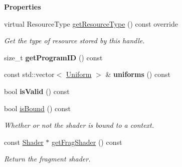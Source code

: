 \begin{Indent}\textbf{ Properties}\par
\begin{DoxyCompactItemize}
\item 
\mbox{\label{classrev_1_1_shader_program_af0766282d3272419d04f83e1a60e2553}} 
virtual Resource\+Type \mbox{\hyperlink{classrev_1_1_shader_program_af0766282d3272419d04f83e1a60e2553}{get\+Resource\+Type}} () const override
\begin{DoxyCompactList}\small\item\em Get the type of resource stored by this handle. \end{DoxyCompactList}\item 
\mbox{\label{classrev_1_1_shader_program_abc56bc121418a497d2a4d6b16f8b9a5d}} 
size\+\_\+t {\bfseries get\+Program\+ID} () const
\item 
\mbox{\label{classrev_1_1_shader_program_abee07f3196597b4d13910ca13d475137}} 
const std\+::vector$<$ \mbox{\hyperlink{structrev_1_1_uniform}{Uniform}} $>$ \& {\bfseries uniforms} () const
\item 
\mbox{\label{classrev_1_1_shader_program_a608666e133268230db42d64fb8b3f9ec}} 
bool {\bfseries is\+Valid} () const
\item 
\mbox{\label{classrev_1_1_shader_program_a02b1e092c2929a72ece758239d769a16}} 
bool \mbox{\hyperlink{classrev_1_1_shader_program_a02b1e092c2929a72ece758239d769a16}{is\+Bound}} () const
\begin{DoxyCompactList}\small\item\em Whether or not the shader is bound to a context. \end{DoxyCompactList}\item 
\mbox{\label{classrev_1_1_shader_program_ac97b6fca77f1133567fedff8f8aa73f2}} 
const \mbox{\hyperlink{classrev_1_1_shader}{Shader}} $\ast$ \mbox{\hyperlink{classrev_1_1_shader_program_ac97b6fca77f1133567fedff8f8aa73f2}{get\+Frag\+Shader}} () const
\begin{DoxyCompactList}\small\item\em Return the fragment shader. \end{DoxyCompactList}\item 

\end{DoxyCompactItemize}
\end{Indent}
